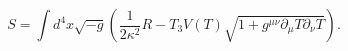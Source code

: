 \begin{equation}\label{gtac}
S=\int d^4x\sqrt{-g}\left(\frac{1}{2\kappa^2}R-T_{3}V(T)
\sqrt{1+g^{\mu\nu}\partial_{\mu}T\partial_{\nu}T}\right).
\end{equation}

